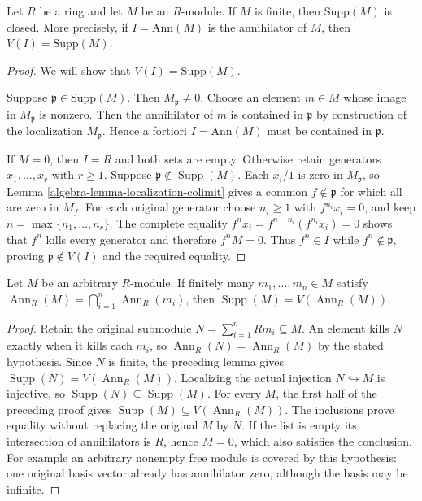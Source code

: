 \begin{lemma}
\label{editorial-source-lemma-support-closed}
Let $R$ be a ring and let $M$ be an $R$-module.
If $M$ is finite, then $\text{Supp}(M)$ is closed.
More precisely, if $I = \text{Ann}(M)$ is the annihilator of $M$, then
$V(I) = \text{Supp}(M)$.
\end{lemma}

\begin{proof}
We will show that $V(I) = \text{Supp}(M)$.

\medskip\noindent
Suppose $\mathfrak p \in \text{Supp}(M)$. Then $M_{\mathfrak p} \not = 0$.
Choose an element $m \in M$ whose image in $M_\mathfrak p$ is nonzero.
Then the annihilator of $m$ is contained in $\mathfrak p$ by construction
of the localization $M_\mathfrak p$. Hence
a fortiori $I = \text{Ann}(M)$ must be contained in $\mathfrak p$.

\medskip\noindent
If $M=0$, then $I=R$ and both sets are empty.
Otherwise retain generators $x_1,\ldots,x_r$ with $r\geq1$.
Suppose $\mathfrak p\notin\operatorname{Supp}(M)$.
Each $x_i/1$ is zero in $M_{\mathfrak p}$, so
Lemma \ref{algebra-lemma-localization-colimit} gives a common
$f\notin\mathfrak p$ for which all are zero in $M_f$.
For each original generator choose $n_i\geq1$ with
$f^{n_i}x_i=0$, and keep $n=\max\{n_1,\ldots,n_r\}$.
The complete equality
$f^nx_i=f^{n-n_i}(f^{n_i}x_i)=0$ shows that $f^n$ kills
every generator and therefore $f^nM=0$.
Thus $f^n\in I$ while $f^n\notin\mathfrak p$, proving
$\mathfrak p\notin V(I)$ and the required equality.
\end{proof}

\begin{lemma}
\label{editorial-source-lemma-support-finite-annihilator-detection}
Let $M$ be an arbitrary $R$-module. If finitely many
$m_1,\ldots,m_n\in M$ satisfy
$\operatorname{Ann}_R(M)=\bigcap_{i=1}^n\operatorname{Ann}_R(m_i)$,
then $\operatorname{Supp}(M)=V(\operatorname{Ann}_R(M))$.
\end{lemma}

\begin{proof}
Retain the original submodule $N=\sum_{i=1}^n Rm_i\subseteq M$.
An element kills $N$ exactly when it kills each $m_i$,
so $\operatorname{Ann}_R(N)=\operatorname{Ann}_R(M)$ by
the stated hypothesis. Since $N$ is finite, the preceding
lemma gives $\operatorname{Supp}(N)=V(\operatorname{Ann}_R(M))$.
Localizing the actual injection $N\hookrightarrow M$
is injective, so $\operatorname{Supp}(N)\subseteq\operatorname{Supp}(M)$.
For every $M$, the first half of the preceding proof
gives $\operatorname{Supp}(M)\subseteq V(\operatorname{Ann}_R(M))$.
The inclusions prove equality without replacing the
original $M$ by $N$. If the list is empty its intersection
of annihilators is $R$, hence $M=0$, which also satisfies
the conclusion. For example an arbitrary nonempty free
module is covered by this hypothesis: one original basis
vector already has annihilator zero, although the basis
may be infinite.
\end{proof}